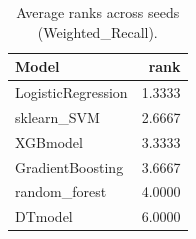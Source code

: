 \begin{table}[t]
\centering
\begin{tabular}{lr}
\toprule
Model & rank \\
\midrule
LogisticRegression & 1.3333 \\
sklearn_SVM & 2.6667 \\
XGBmodel & 3.3333 \\
GradientBoosting & 3.6667 \\
random_forest & 4.0000 \\
DTmodel & 6.0000 \\
\bottomrule
\end{tabular}
\caption{Average ranks across seeds (Weighted_Recall).}
\label{tab:avg_rank_Weighted_Recall}
\end{table}